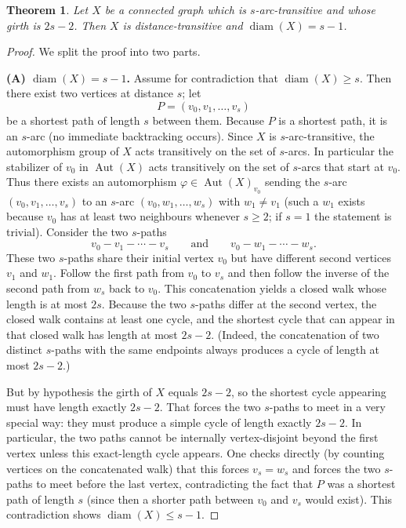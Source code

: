 \documentclass[12pt,a4paper,openany]{book}
\newtheorem{theorem}{Theorem}[section]
\begin{document}
\begin{theorem}
Let \(X\) be a connected graph which is \(s\)-arc-transitive and whose girth
is \(2s-2\). Then \(X\) is distance-transitive and
\(\operatorname{diam}(X)=s-1\).
\end{theorem}

\begin{proof}
We split the proof into two parts.

\medskip\noindent\textbf{(A) \(\operatorname{diam}(X)=s-1\).}  
Assume for contradiction that \(\operatorname{diam}(X)\ge s\). Then there
exist two vertices at distance \(s\); let
\[
P=(v_0,v_1,\dots,v_s)
\]
be a shortest path of length \(s\) between them. Because \(P\) is a
shortest path, it is an \(s\)-arc (no immediate backtracking occurs).
Since \(X\) is \(s\)-arc-transitive, the automorphism group of \(X\)
acts transitively on the set of \(s\)-arcs. In particular the stabilizer
of \(v_0\) in \(\operatorname{Aut}(X)\) acts transitively on the set of
\(s\)-arcs that start at \(v_0\). Thus there exists an automorphism
\(\varphi\in\operatorname{Aut}(X)_{v_0}\) sending the \(s\)-arc
\((v_0,v_1,\dots,v_s)\) to an \(s\)-arc
\((v_0,w_1,\dots,w_s)\) with \(w_1\neq v_1\) (such a \(w_1\) exists
because \(v_0\) has at least two neighbours whenever \(s\ge2\); if \(s=1\)
the statement is trivial). Consider the two \(s\)-paths
\[
v_0\!-\!v_1\!-\!\cdots\!-\!v_s\qquad\text{and}\qquad
v_0\!-\!w_1\!-\!\cdots\!-\!w_s.
\]
These two \(s\)-paths share their initial vertex \(v_0\) but have
different second vertices \(v_1\) and \(w_1\). Follow the first path
from \(v_0\) to \(v_s\) and then follow the inverse of the second path
from \(w_s\) back to \(v_0\). This concatenation yields a closed walk
whose length is at most \(2s\). Because the two \(s\)-paths differ at
the second vertex, the closed walk contains at least one cycle, and the
shortest cycle that can appear in that closed walk has length at most
\(2s-2\). (Indeed, the concatenation of two distinct \(s\)-paths with
the same endpoints always produces a cycle of length at most \(2s-2\).)

But by hypothesis the girth of \(X\) equals \(2s-2\), so the shortest
cycle appearing must have length exactly \(2s-2\). That forces the two
\(s\)-paths to meet in a very special way: they must produce a simple
cycle of length exactly \(2s-2\). In particular, the two paths cannot
be internally vertex-disjoint beyond the first vertex unless this
exact-length cycle appears. One checks directly (by counting vertices
on the concatenated walk) that this forces \(v_s=w_s\) and forces the
two \(s\)-paths to meet before the last vertex, contradicting the fact
that \(P\) was a shortest path of length \(s\) (since then a shorter
path between \(v_0\) and \(v_s\) would exist). This contradiction shows
\(\operatorname{diam}(X)\le s-1\).


\end{proof}
\end{document}
